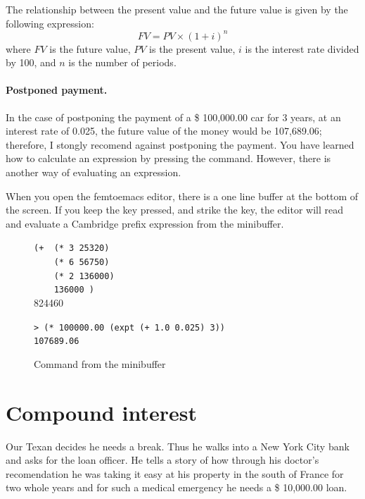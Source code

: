 \documentclass[a4paper,12pt]{book}
\newenvironment{fmpage}[1]
           {\begin{lrbox}{\fmbox}\begin{minipage}{#1}}
           {\end{minipage}\end{lrbox}\fbox{\usebox{\fmbox}}}
\begin{document}
The relationship between the present value
and the future value is given by the
following expression:
\begin{equation}
FV= PV\times (1+i)^n
\label{eq:future-value}
\end{equation}
where $FV$ is the future value, $PV$ is the present
value, $i$ is the interest rate divided by 100,
and $n$ is the number of periods.

\paragraph{Postponed payment.}
In the case of postponing the payment of a \$ 100,000.00 car
for 3 years, at an interest rate of 0.025, the future
value of the money would be 107,689.06; therefore,
I stongly recomend against postponing the payment.
You have learned how to calculate an expression
by pressing the \keys{~]~} command.
However, there is another way of evaluating an expression.

When you open the femtoemacs editor, there is
a one line buffer at the bottom of the screen.
If you keep the  key pressed,
and strike the   key, the editor
will read and evaluate a Cambridge prefix
expression from the minibuffer.

\begin{figure}[!h]
\begin{fmpage}{0.8\textwidth}

\verb|(+  (* 3 25320)|\\
\verb|    (* 6 56750)|\\
\verb|    (* 2 136000)|\\
\verb|    136000 )|\keys{~]~}\\ 
824460
\end{fmpage}

\begin{fmpage}{0.8\textwidth}
\verb|> (* 100000.00 (expt (+ 1.0 0.025) 3))|\\
\verb|107689.06|
\end{fmpage}
\caption{Command from the minibuffer}
\label{future-value}
\end{figure}

\section{Compound interest}

Our Texan decides he needs a break. Thus he walks into
a New York City bank and asks for the loan officer.
He tells a story of how through his doctor's recomendation
he was taking it easy at his property in the south of
France for two whole years and for such a medical
emergency he needs a \$ 10,000.00 loan.
\end{document}
